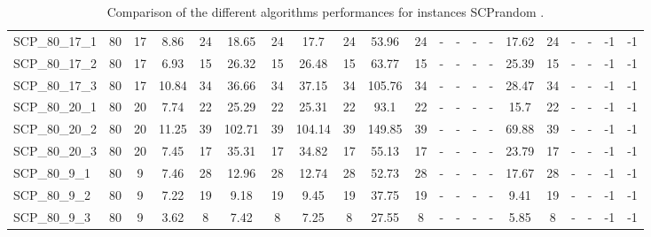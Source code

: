 \begin{sidewaystable}[!ht]
{\begin{tabular}{lcccccccccccccccccccc}
SCP\_80\_17\_1 & 80 & 17 &  \textcolor{blue2}{8.86} & 24 & 18.65 & 24 & 17.7 & 24 & 53.96 & 24 &  - &  - &  - &  - & 17.62 & 24 &  - &  - & -1 & -1 \\
SCP\_80\_17\_2 & 80 & 17 &  \textcolor{blue2}{6.93} & 15 & 26.32 & 15 & 26.48 & 15 & 63.77 & 15 &  - &  - &  - &  - & 25.39 & 15 &  - &  - & -1 & -1 \\
SCP\_80\_17\_3 & 80 & 17 &  \textcolor{blue2}{10.84} & 34 & 36.66 & 34 & 37.15 & 34 & 105.76 & 34 &  - &  - &  - &  - & 28.47 & 34 &  - &  - & -1 & -1 \\
SCP\_80\_20\_1 & 80 & 20 &  \textcolor{blue2}{7.74} & 22 & 25.29 & 22 & 25.31 & 22 & 93.1 & 22 &  - &  - &  - &  - & 15.7 & 22 &  - &  - & -1 & -1 \\
SCP\_80\_20\_2 & 80 & 20 &  \textcolor{blue2}{11.25} & 39 & 102.71 & 39 & 104.14 & 39 & 149.85 & 39 &  - &  - &  - &  - & 69.88 & 39 &  - &  - & -1 & -1 \\
SCP\_80\_20\_3 & 80 & 20 &  \textcolor{blue2}{7.45} & 17 & 35.31 & 17 & 34.82 & 17 & 55.13 & 17 &  - &  - &  - &  - & 23.79 & 17 &  - &  - & -1 & -1 \\
SCP\_80\_9\_1 & 80 & 9 &  \textcolor{blue2}{7.46} & 28 & 12.96 & 28 & 12.74 & 28 & 52.73 & 28 &  - &  - &  - &  - & 17.67 & 28 &  - &  - & -1 & -1 \\
SCP\_80\_9\_2 & 80 & 9 &  \textcolor{blue2}{7.22} & 19 & 9.18 & 19 & 9.45 & 19 & 37.75 & 19 &  - &  - &  - &  - & 9.41 & 19 &  - &  - & -1 & -1 \\
SCP\_80\_9\_3 & 80 & 9 &  \textcolor{blue2}{3.62} & 8 & 7.42 & 8 & 7.25 & 8 & 27.55 & 8 &  - &  - &  - &  - & 5.85 & 8 &  - &  - & -1 & -1 \\
\bottomrule
\end{tabular}
}%
\caption{Comparison of the different algorithms performances for instances SCPrandom .}
\label{tab:table_compare_SCPrandom }
\end{sidewaystable}
